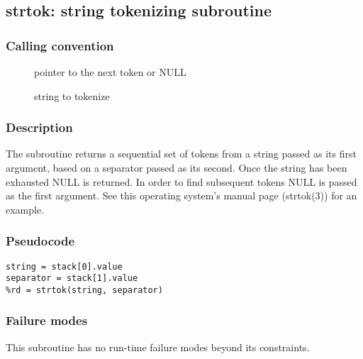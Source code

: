 \clearpage
{}
{}
\label{subr:strtok}
\subsection*{strtok: string tokenizing subroutine}

\subsubsection*{Calling convention}

\begin{description}
\item[] pointer to the next token or NULL
\item[] string to tokenize
\end{description}

\subsubsection*{Description}

The  subroutine returns a sequential set of tokens
from a string passed as its first argument, based on a separator
passed as its second.  Once the string has been exhausted NULL is
returned.  In order to find subsequent tokens NULL is passed as the
first argument.  See this operating system's 
manual page (strtok(3)) for an example.

\subsubsection*{Pseudocode}

\begin{verbatim}
string = stack[0].value
separator = stack[1].value
%rd = strtok(string, separator)
\end{verbatim}

\subsubsection*{Failure modes}

This subroutine has no run-time failure modes beyond its constraints.
